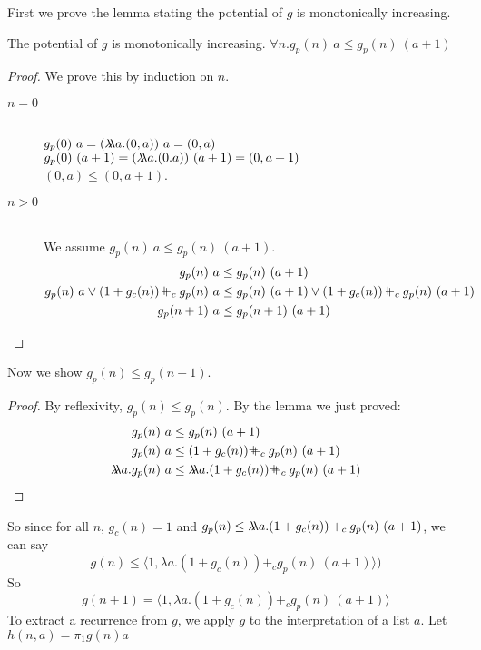 %
First we prove the lemma stating the potential of $g$ is monotonically
increasing.
%
\begin{lemma}
  \label{lem:fr_interp_g_potential_monotonically_increasing}
  The potential of $g$ is monotonically increasing.
  $\forall n.g_p(n)\ a \leq g_p(n)\ (a+1)$
\end{lemma}
%
\begin{proof}
  We prove this by induction on $n$.
  \begin{description}
    \item[$n=0$]\hfill \\
      $g_p(0)\ a = (\lambda\!\!\lambda a.(0,a))\ a = (0,a)$\\
      $g_p(0)\ (a+1) = (\lambda\!\!\lambda a.(0.a))\ (a+1) = (0,a+1)$\\
      $(0,a) \leq (0,a+1)$.
    \item[$n>0$]\hfill \\
      We assume $g_p(n)\ a \leq g_p(n)\ (a+1)$.
      \begin{align*}
      g_p(n)\ a &\leq g_p(n)\ (a+1)  \\
      g_p(n)\ a \vee (1 + g_c(n)) \pplus_c g_p(n)\ a &\leq g_p(n)\ (a+1) \vee (1 + g_c(n)) \pplus_c g_p(n)\ (a+1) \\
      g_p(n+1)\ a &\leq g_p(n+1)\ (a+1)
      \end{align*}
  \end{description}
\end{proof}
%
Now we show $g_p(n) \leq g_p(n+1)$.
%
\begin{proof}
  By reflexivity, $g_p(n) \leq g_p(n)$.
  By the lemma we just proved:
  \begin{align*}
  g_p(n)\ a &\leq g_p(n)\ (a+1) \\
  g_p(n)\ a &\leq (1 + g_c(n)) \pplus_c g_p(n)\ (a+1) \\
  \llambda a.g_p(n)\ a &\leq \llambda a. (1 + g_c(n)) \pplus_c g_p(n)\ (a+1) \\
  \end{align*}
\end{proof}
%
So since for all $n$, $g_c(n) = 1$ and $g_p(n) \leq \lambda\!\!\lambda a. (1 + g_c(n)) +_c g_p(n)\ (a+1)$, we can say
%
\[ g(n) \leq \langle 1, \lambda a. (1 + g_c(n)) +_c g_p(n)\ (a+1)\rangle) \]
%
So 
\[ g(n+1) = \langle 1, \lambda a. (1 + g_c(n)) +_c g_p(n)\ (a+1)\rangle\]
%
%
To extract a recurrence from $g$, we apply $g$ to the interpretation of a list $a$.
%
Let $h(n,a) = \pi_1 g(n) a$
